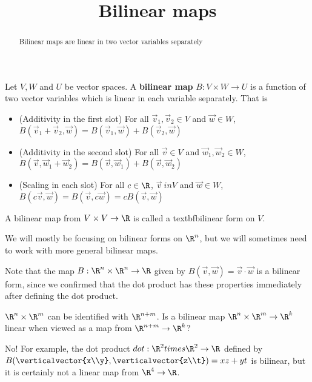 \documentclass{ximera}
\title{Bilinear maps}
\begin{document}
\begin{abstract}
	Bilinear maps are linear in two vector variables separately 
\end{abstract}	

	\begin{definition}
		Let $V,W$ and $U$ be vector spaces.  A \textbf{bilinear map} $B: V \times W \to U$ is a function of two vector variables which is linear in each variable separately. 
		That is
			\begin{itemize}
				\item (Additivity in the first slot) For all $\vec{v}_1,\vec{v}_2 \in V$ and 
				$\vec{w} \in W$, $B(\vec{v}_1+\vec{v}_2,\vec{w}) = B(\vec{v}_1,\vec{w})+B(\vec{v}_2,\vec{w})$
				
				\item (Additivity in the second slot) For all $\vec{v} \in V$ and 
				$\vec{w}_1,\vec{w}_2 \in W$, $B(\vec{v},\vec{w}_1+\vec{w}_2) = B(\vec{v},\vec{w}_1)+B(\vec{v},\vec{w}_2)$
				
				\item (Scaling in each slot) For all $c \in \R$, $\vec{v} \ in V$ and 
				$\vec{w} \in W$, $B(c\vec{v},\vec{w}) = B(\vec{v},c\vec{w}) = cB(\vec{v},\vec{w})$
			\end{itemize}
	\end{definition}
	
	A bilinear map from $V \times V \to \R$ is called a textbf{bilinear form} on $V$.
	
	We will mostly be focusing on bilinear forms on $\R^n$, but we will sometimes need to work with more general bilinear maps.
	
	Note that the map $B:\R^n \times \R^n \to \R$ given by $B(\vec{v},\vec{w}) = \vec{v} \cdot \vec{w}$ is a bilinear form, since we confirmed that
	the dot product has these properties immediately after defining the dot product.
	
		$\R^n \times \R^m$ can be identified with $\R^{n+m}$.  Is a bilinear map $\R^n \times \R^m \to \R^k$ linear when viewed as a map from $\R^{n+m} \to \R^k$?
	\begin{free-response}
		No!  For example, the dot product $dot:\R^2 times \R^2 \to \R$ defined by $B(\verticalvector{x\\y},\verticalvector{z\\t})=xz+yt$ is bilinear, but it is certainly not a linear map from $\R^4 \to \R$.
	\end{free-response}
	
\end{document}
